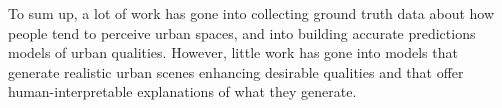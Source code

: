\mbox{}
To sum up, a lot of work has gone into collecting ground truth data about how people tend to perceive urban spaces, and into building accurate predictions models of urban qualities. However,  little work has gone into models that generate realistic urban scenes enhancing desirable qualities and that offer human-interpretable explanations of what they generate. 







